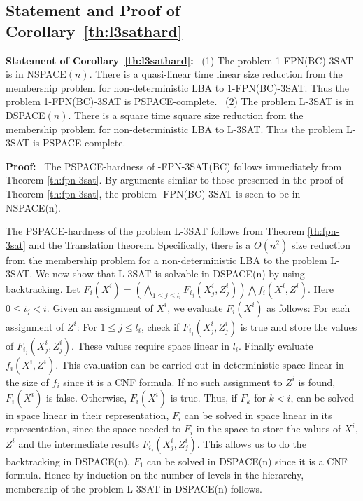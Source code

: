 \subsection{Statement and Proof of Corollary~\ref{th:l3sathard}}

\noindent
\textbf{Statement of Corollary~\ref{th:l3sathard}:}~
(1) The problem 1-FPN(BC)-3SAT is in NSPACE$(n)$.
There is a quasi-linear
time linear size reduction from the membership problem for non-deterministic
LBA to 1-FPN(BC)-3SAT.
Thus the  problem 1-FPN(BC)-3SAT is PSPACE-complete.~
(2)
The problem L-3SAT is in DSPACE$(n)$.
There is a square time
square size reduction from the membership problem for non-deterministic
LBA to L-3SAT. Thus the  problem L-3SAT is PSPACE-complete.

\medskip

\noindent
{\bf Proof:}~
The {\sf PSPACE}-hardness of {-FPN-3SAT(BC)} follows 
immediately from Theorem \ref{th:fpn-3sat}.
By arguments similar to those
presented in the proof of Theorem \ref{th:fpn-3sat}, 
the problem {-FPN(BC)-3SAT}  is seen to be in {\sf NSPACE(n)}.

The {\sf PSPACE}-hardness of  the problem {\sf L-3SAT} follows
from Theorem \ref{th:fpn-3sat} and the Translation theorem. Specifically,
there is a $O(n^2)$ size reduction from the membership problem for a  
non-deterministic {\sf LBA} to the problem  {\sf L-3SAT}.
We now show that {\sf L-3SAT} is solvable in {\sf DSPACE(n)}
by using backtracking. 
Let $\displaystyle{F_i(X^i)=(\bigwedge_{1 \leq j \leq  l_i} 
F_{i_j}(X^i_j,Z^i_j)) \bigwedge f_i(X^i,Z^i)}$.
Here $0 \leq i_j <i$.
Given an assignment of $X^i$, 
we evaluate $F_i(X^i)$ as follows:
For each assignment of $Z^i$:
For $1 \leq j \leq  l_i$, 
check if $F_{i_j}(X^i_j,Z^i_j)$ is true and store the values of 
$F_{i_j}(X^i_j,Z^i_j)$.
These values require space linear in $l_i$. Finally evaluate $f_i(X^i,Z^i)$.
This evaluation can be carried out in deterministic space linear in the size of
$f_i$ since it is a {\sf CNF} formula.
If no such assignment to $Z^i$ is found, 
$F_i(X^i)$ is false. Otherwise, $F_i(X^i)$ is true.
Thus, if $F_k$ for $k < i$, can be solved in space linear in their
representation, $F_i$ can be solved in space linear in its representation,
since the space needed to $F_i$ in the space to store the values of
$X^i$, $Z^i$ and the intermediate results $F_{i_j}(X^i_j,Z^i_j)$. This
allows us to do the backtracking in {\sf DSPACE(n)}.
$F_1$ can be solved in {\sf DSPACE(n)}  since it is a {\sf CNF} formula.
Hence by induction on the number of levels in the hierarchy, membership of
the problem {\sf L-3SAT} in {\sf DSPACE(n)} follows. \hfill\QED


